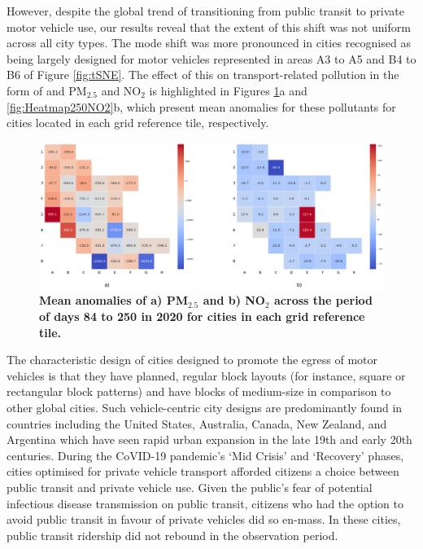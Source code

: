 \documentclass[preprint,12pt]{elsarticle}
\begin{document}
However, despite the global trend of transitioning from public transit to private motor vehicle use\cite{fernando2023shaping}, our results reveal that the extent of this shift was not uniform across all city types. The mode shift  was more pronounced in cities recognised as being largely designed for motor vehicles\cite{Thompson2020} represented in areas A3 to A5 and B4 to B6 of Figure \ref{fig:tSNE}. The effect of this on transport-related pollution in the form of and PM$_{2.5}$ and NO$_{2}$ is highlighted in Figures \ref{fig:Heatmap250PM}a and \ref{fig:Heatmap250NO2}b, which present mean anomalies for these pollutants for cities located in each grid reference tile, respectively.


\begin{figure}
\centering

\includegraphics[trim={0 0 0 0},clip,scale=0.25]{Images/pm25Anomaly250_no2Reduction7Ave7Ave250.png}
\caption{\bf Mean anomalies of a) PM$_{2.5}$ and b) NO$_{2}$ across the period of days 84 to 250 in 2020 for cities in each grid reference tile.}  
 \label{fig:Heatmap250NO2}\label{fig:Heatmap250PM}
\end{figure}

The characteristic design of cities designed to promote the egress of motor vehicles is that they have planned, regular block layouts (for instance, square or rectangular block patterns) and have blocks of medium-size in comparison to other global cities\cite{Thompson2020}. Such vehicle-centric city designs are predominantly found in countries including the United States, Australia, Canada, New Zealand, and Argentina which have seen rapid urban expansion in the late 19th and early 20th centuries. During the CoVID-19 pandemic's `Mid Crisis' and `Recovery' phases, cities optimised for private vehicle transport afforded citizens a choice between public transit and private vehicle use. Given the public's fear of potential infectious disease transmission on public transit\cite{fernando2023shaping}, citizens who had the option to avoid public transit in favour of private vehicles did so en-mass. In these cities, public transit ridership did not rebound in the observation period. 
\end{document}
